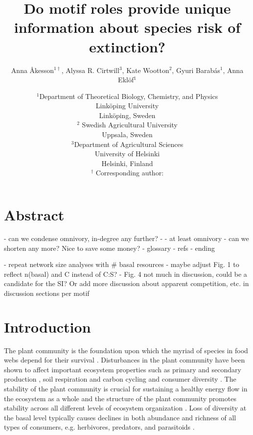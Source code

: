 \documentclass[12pt]{article}
\title{Do motif roles provide unique information about species risk of extinction?}
\author{Anna \r{A}kesson$^{1\dagger}$, Alyssa R. Cirtwill$^{3}$, Kate Wootton$^{2}$, Gyuri Barab\'{a}s$^{1}$, Anna Ekl\"{o}f$^{1}$}
\date{\small$^1$Department of Theoretical Biology, Chemistry, and Physics\\ 
Link\"{o}ping University\\
Link\"{o}ping, Sweden\\
\medskip
\small$^2$ Swedish Agricultural University\\
Uppsala, Sweden\\
\medskip
\small$^3$Department of Agricultural Sciences\\
University of Helsinki\\
Helsinki, Finland\\
\medskip
$^\dagger$ Corresponding author:\\
}
\begin{document}
 
\maketitle 
\raggedright

\setlength{\parindent}{15pt} 
\begin{spacing}{2.0}


\section*{Abstract}

    - can we condense omnivory, in-degree any further?
    - - at least omnivory
    - can we shorten any more? Nice to save some money?
    - glossary
    - refs
    - ending

    - repeat network size analyses with \# basal resources - maybe adjust Fig. 1 to reflect n(basal) and C instead of C:S?
    - Fig. 4 not much in discussion, could be a candidate for the SI? Or add more discussion about apparent competition, etc. in discussion sections per motif

\clearpage
\section*{Introduction}

     The plant community is the foundation upon which the myriad of species in food webs depend for their survival \citep{}. Disturbances in the plant community have been shown to affect important ecosystem properties such as primary \citep{} and secondary production \citep{borer2012plant}, soil respiration and carbon cycling \citep{chen2019plant} and consumer diversity \citep{scherber2010bottom, Baiser2016}. The stability of the plant community is crucial for sustaining a healthy energy flow in the ecosystem as a whole \citep{Rosenblatt2016} and the structure of the plant community promotes stability across all different levels of ecosystem organization \citep{proulx2010diversity,scherber2010bottom}. Loss of diversity at the basal level typically causes declines in both abundance and richness of all types of consumers, e.g. herbivores, predators, and parasitoids \citep{scherber2010bottom}.
    

\end{spacing}
\end{document}

